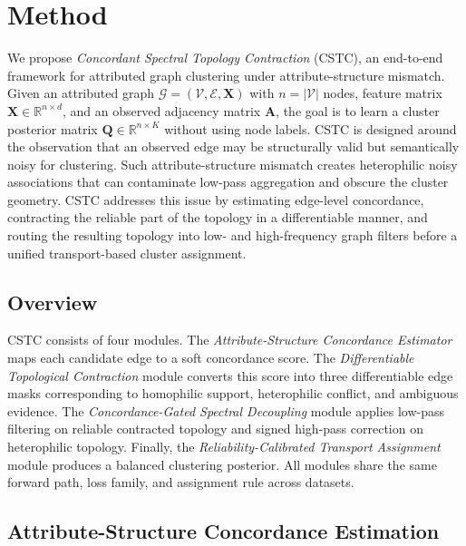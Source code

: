 \section{Method}
\label{sec:method}

We propose \emph{Concordant Spectral Topology Contraction} (CSTC), an end-to-end framework for attributed graph clustering under attribute-structure mismatch. Given an attributed graph $\mathcal{G}=(\mathcal{V},\mathcal{E},\mathbf{X})$ with $n=|\mathcal{V}|$ nodes, feature matrix $\mathbf{X}\in\mathbb{R}^{n\times d}$, and an observed adjacency matrix $\mathbf{A}$, the goal is to learn a cluster posterior matrix $\mathbf{Q}\in\mathbb{R}^{n\times K}$ without using node labels. CSTC is designed around the observation that an observed edge may be structurally valid but semantically noisy for clustering. Such attribute-structure mismatch creates heterophilic noisy associations that can contaminate low-pass aggregation and obscure the cluster geometry. CSTC addresses this issue by estimating edge-level concordance, contracting the reliable part of the topology in a differentiable manner, and routing the resulting topology into low- and high-frequency graph filters before a unified transport-based cluster assignment.

\subsection{Overview}
\label{subsec:method-overview}

CSTC consists of four modules. The \emph{Attribute-Structure Concordance Estimator} maps each candidate edge to a soft concordance score. The \emph{Differentiable Topological Contraction} module converts this score into three differentiable edge masks corresponding to homophilic support, heterophilic conflict, and ambiguous evidence. The \emph{Concordance-Gated Spectral Decoupling} module applies low-pass filtering on reliable contracted topology and signed high-pass correction on heterophilic topology. Finally, the \emph{Reliability-Calibrated Transport Assignment} module produces a balanced clustering posterior. All modules share the same forward path, loss family, and assignment rule across datasets.

\subsection{Attribute-Structure Concordance Estimation}
\label{subsec:concordance}

